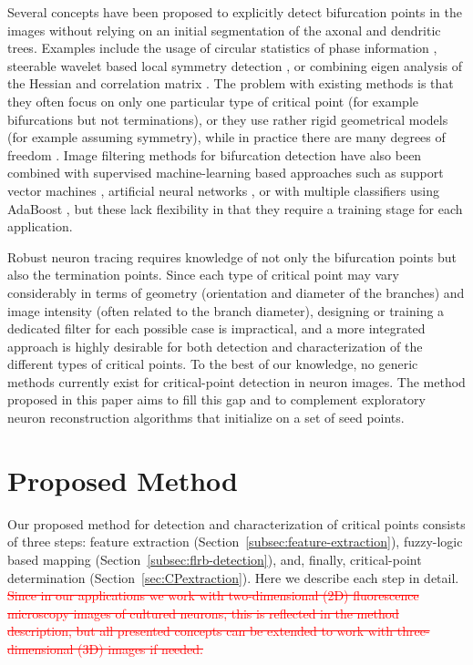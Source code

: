 \documentclass[twocolumn,natbib]{svjour3}
\newcommand{\struck}[1]{\textcolor{red}{\sout{#1}}}
\begin{document}
Several concepts have been proposed to explicitly detect bifurcation points in the images without relying on an initial segmentation of the axonal and dendritic trees. Examples include the usage of circular statistics of phase information \citep{obaraa2012contrast}, steerable wavelet based local symmetry detection \citep{puspoki2013detection}, or combining eigen analysis of the Hessian and correlation matrix \citep{su2012junction}. The problem with existing methods is that they often focus on only one particular type of critical point (for example bifurcations but not terminations), or they use rather rigid geometrical models (for example assuming symmetry), while in practice there are many degrees of freedom \citep{michaelis1994junction}. Image filtering methods for bifurcation detection have also been combined with supervised machine-learning based approaches such as support vector machines \citep{turetken2011automated}, artificial neural networks \citep{bevilacqua2009comparison}, or with multiple classifiers using AdaBoost \citep{zhou2007vascular}, but these lack flexibility in that they require a training stage for each application.

Robust neuron tracing requires knowledge of not only the bifurcation points but also the termination points. Since each type of critical point may vary considerably in terms of geometry (orientation and diameter of the branches) and image intensity (often related to the branch diameter), designing or training a dedicated filter for each possible case is impractical, and a more integrated approach is highly desirable for both detection and characterization of the different types of critical points. To the best of our knowledge, no generic methods currently exist for critical-point detection in neuron images. The method proposed in this paper aims to fill this gap and to complement exploratory neuron reconstruction algorithms that initialize on a set of seed points.

\section{Proposed Method}
\label{sec:proposed-approach}
Our proposed method for detection and characterization of critical points consists of three steps: feature extraction (Section~\ref{subsec:feature-extraction}), fuzzy-logic based mapping (Section~\ref{subsec:flrb-detection}), and, finally, critical-point determination (Section~\ref{sec:CPextraction}). Here we describe each step in detail. \struck{Since in our applications we work with two-dimensional (2D) fluorescence microscopy images of cultured neurons, this is reflected in the method description, but all presented concepts can be extended to work with three-dimensional (3D) images if needed.}
\end{document}
